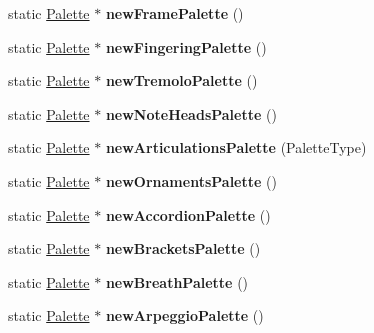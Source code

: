 \begin{DoxyCompactItemize}
static \hyperlink{class_ms_1_1_palette}{Palette} $\ast$ {\bfseries new\+Frame\+Palette} ()
\item 
\mbox{\label{class_ms_1_1_muse_score_a866e520c18da0a7095d46d43c0b2d6cb}} 
static \hyperlink{class_ms_1_1_palette}{Palette} $\ast$ {\bfseries new\+Fingering\+Palette} ()
\item 
\mbox{\label{class_ms_1_1_muse_score_af6126708c3e0ad9048b54942bed7e5a3}} 
static \hyperlink{class_ms_1_1_palette}{Palette} $\ast$ {\bfseries new\+Tremolo\+Palette} ()
\item 
\mbox{\label{class_ms_1_1_muse_score_ac5d15ed1e77250fdcb1e90213c8c42c7}} 
static \hyperlink{class_ms_1_1_palette}{Palette} $\ast$ {\bfseries new\+Note\+Heads\+Palette} ()
\item 
\mbox{\label{class_ms_1_1_muse_score_afc0bf2ec1c359540a5b24cdfb64714a8}} 
static \hyperlink{class_ms_1_1_palette}{Palette} $\ast$ {\bfseries new\+Articulations\+Palette} (Palette\+Type)
\item 
\mbox{\label{class_ms_1_1_muse_score_a8cb97a9c04fd4d81adb7e0d14dc23819}} 
static \hyperlink{class_ms_1_1_palette}{Palette} $\ast$ {\bfseries new\+Ornaments\+Palette} ()
\item 
\mbox{\label{class_ms_1_1_muse_score_a355b29f1de3142856d115006d0fff885}} 
static \hyperlink{class_ms_1_1_palette}{Palette} $\ast$ {\bfseries new\+Accordion\+Palette} ()
\item 
\mbox{\label{class_ms_1_1_muse_score_adde4f3542cf2cdd2cdecae846e11be2e}} 
static \hyperlink{class_ms_1_1_palette}{Palette} $\ast$ {\bfseries new\+Brackets\+Palette} ()
\item 
\mbox{\label{class_ms_1_1_muse_score_a952e3c25db9aa0603f54b09a3ede4088}} 
static \hyperlink{class_ms_1_1_palette}{Palette} $\ast$ {\bfseries new\+Breath\+Palette} ()
\item 
\mbox{\label{class_ms_1_1_muse_score_a1c63c1a71fad10a098bf6739a7f87607}} 
static \hyperlink{class_ms_1_1_palette}{Palette} $\ast$ {\bfseries new\+Arpeggio\+Palette} ()

\end{DoxyCompactItemize}
